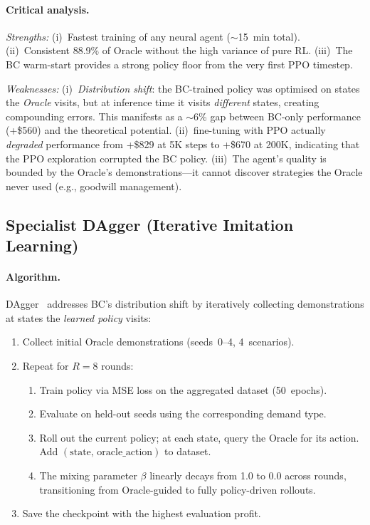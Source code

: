 \paragraph{Critical analysis.}
\emph{Strengths:} (i)~Fastest training of any neural agent ($\sim$15~min
total). (ii)~Consistent 88.9\% of Oracle without the high variance of pure
RL. (iii)~The BC warm-start provides a strong policy floor from the very
first PPO timestep.

\emph{Weaknesses:} (i)~\emph{Distribution shift}: the BC-trained policy was
optimised on states the \emph{Oracle} visits, but at inference time it visits
\emph{different} states, creating compounding errors. This manifests as a
$\sim$6\% gap between BC-only performance (+\$560) and the theoretical
potential. (ii)~fine-tuning with PPO actually \emph{degraded} performance
from +\$829 at 5K steps to +\$670 at 200K, indicating that the PPO
exploration corrupted the BC policy. (iii)~The agent's quality is bounded
by the Oracle's demonstrations---it cannot discover strategies the Oracle
never used (e.g., goodwill management).

\subsection{Specialist DAgger (Iterative Imitation Learning)}

\paragraph{Algorithm.}
DAgger~\citep{ross2011reduction} addresses BC's distribution shift by
iteratively collecting demonstrations at states the \emph{learned policy}
visits:

\begin{enumerate}
  \item Collect initial Oracle demonstrations (seeds~0--4, 4~scenarios).
  \item Repeat for $R{=}8$ rounds:
  \begin{enumerate}[label=\alph*.]
    \item Train policy via MSE loss on the aggregated dataset (50~epochs).
    \item Evaluate on held-out seeds using the corresponding demand type.
    \item Roll out the current policy; at each state, query the Oracle
          for its action. Add $(\text{state, oracle\_action})$ to dataset.
    \item The mixing parameter $\beta$ linearly decays from 1.0 to 0.0
          across rounds, transitioning from Oracle-guided to fully
          policy-driven rollouts.
  \end{enumerate}
  \item Save the checkpoint with the highest evaluation profit.
\end{enumerate}

